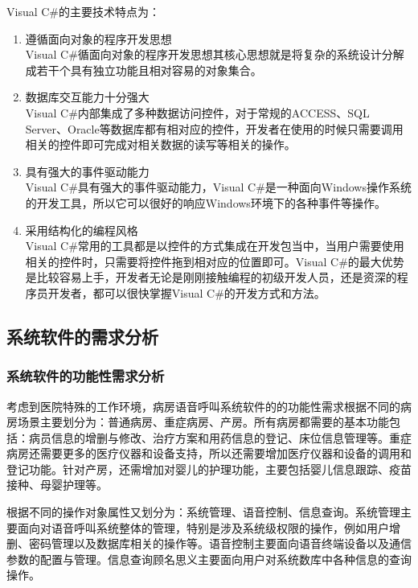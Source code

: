Visual C{\#}的主要技术特点为：
\begin{enumerate}
\item 遵循面向对象的程序开发思想\\
Visual C{\#}循面向对象的程序开发思想其核心思想就是将复杂的系统设计分解成若干个具有独立功能且相对容易的对象集合。

\item 数据库交互能力十分强大\\
Visual C{\#}内部集成了多种数据访问控件，对于常规的ACCESS、SQL Server、Oracle等数据库都有相对应的控件，开发者在使用的时候只需要调用相关的控件即可完成对相关数据的读写等相关的操作。

\item 具有强大的事件驱动能力\\
Visual C{\#}具有强大的事件驱动能力，Visual C{\#}是一种面向Windows操作系统的开发工具，所以它可以很好的响应Windows环境下的各种事件等操作。

\item 采用结构化的编程风格\\
Visual C{\#}常用的工具都是以控件的方式集成在开发包当中，当用户需要使用相关的控件时，只需要将控件拖到相对应的位置即可。Visual C{\#}的最大优势是比较容易上手，开发者无论是刚刚接触编程的初级开发人员，还是资深的程序员开发者，都可以很快掌握Visual C{\#}的开发方式和方法。
\end{enumerate}

\subsection{系统软件的需求分析}\label{soft_requirement}
\subsubsection{系统软件的功能性需求分析}
考虑到医院特殊的工作环境，病房语音呼叫系统软件的的功能性需求根据不同的病房场景主要划分为：普通病房、重症病房、产房。所有病房都需要的基本功能包括：病员信息的增删与修改、治疗方案和用药信息的登记、床位信息管理等。重症病房还需要更多的医疗仪器和设备支持，所以还需要增加医疗仪器和设备的调用和登记功能。针对产房，还需增加对婴儿的护理功能，主要包括婴儿信息跟踪、疫苗接种、母婴护理等。

根据不同的操作对象属性又划分为：系统管理、语音控制、信息查询。系统管理主要面向对语音呼叫系统整体的管理，特别是涉及系统级权限的操作，例如用户增删、密码管理以及数据库相关的操作等。语音控制主要面向语音终端设备以及通信参数的配置与管理。信息查询顾名思义主要面向用户对系统数库中各种信息的查询操作。

